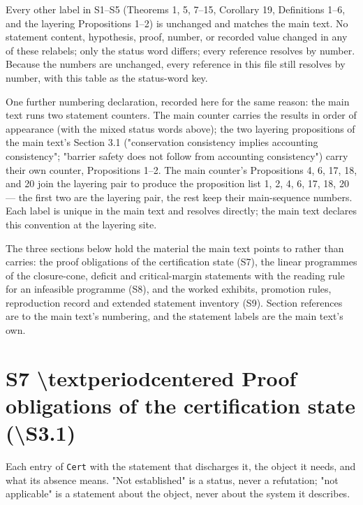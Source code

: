 \documentclass[11pt]{article}
\begin{document}
Every other label in S1--S5 (Theorems 1, 5, 7--15, Corollary 19, Definitions 1--6, and the layering Propositions 1--2) is unchanged and matches the main text. No statement content, hypothesis, proof, number, or recorded value changed in any of these relabels; only the status word differs; every reference resolves by number. Because the numbers are unchanged, every reference in this file still resolves by number, with this table as the status-word key.

One further numbering declaration, recorded here for the same reason: the main text runs two statement counters. The main counter carries the results in order of appearance (with the mixed status words above); the two layering propositions of the main text's Section 3.1 ("conservation consistency implies accounting consistency"; "barrier safety does not follow from accounting consistency") carry their own counter, Propositions 1--2. The main counter's Propositions 4, 6, 17, 18, and 20 join the layering pair to produce the proposition list 1, 2, 4, 6, 17, 18, 20 --- the first two are the layering pair, the rest keep their main-sequence numbers. Each label is unique in the main text and resolves directly; the main text declares this convention at the layering site.

\vspace{0.8em}

The three sections below hold the material the main text points to rather than carries: the proof obligations of the certification state (S7), the linear programmes of the closure-cone, deficit and critical-margin statements with the reading rule for an infeasible programme (S8), and the worked exhibits, promotion rules, reproduction record and extended statement inventory (S9). Section references are to the main text's numbering, and the statement labels are the main text's own.

\section*{S7 \textbackslash{}textperiodcentered{} Proof obligations of the certification state (\textbackslash{}S{}3.1)}\label{s7-textperiodcentered{}-proof-obligations-of-the-certification-state-s}

Each entry of \texttt{Cert} with the statement that discharges it, the object it needs, and what its absence means. "Not established" is a status, never a refutation; "not applicable" is a statement about the object, never about the system it describes.
\end{document}
